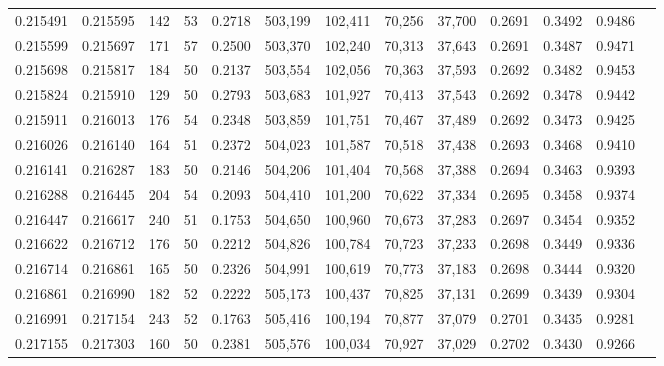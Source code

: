 \begin{tabular}{rrrrrrrrrrrrr}
0.215491 & 0.215595 &   142 &  53 &                                     0.2718 & 503,199 & 102,411 &  70,256 &  37,700 & 0.2691 & 0.3492 & 0.9486 \\
0.215599 & 0.215697 &   171 &  57 &                                     0.2500 & 503,370 & 102,240 &  70,313 &  37,643 & 0.2691 & 0.3487 & 0.9471 \\
0.215698 & 0.215817 &   184 &  50 &                                     0.2137 & 503,554 & 102,056 &  70,363 &  37,593 & 0.2692 & 0.3482 & 0.9453 \\
0.215824 & 0.215910 &   129 &  50 &                                     0.2793 & 503,683 & 101,927 &  70,413 &  37,543 & 0.2692 & 0.3478 & 0.9442 \\
0.215911 & 0.216013 &   176 &  54 &                                     0.2348 & 503,859 & 101,751 &  70,467 &  37,489 & 0.2692 & 0.3473 & 0.9425 \\
0.216026 & 0.216140 &   164 &  51 &                                     0.2372 & 504,023 & 101,587 &  70,518 &  37,438 & 0.2693 & 0.3468 & 0.9410 \\
0.216141 & 0.216287 &   183 &  50 &                                     0.2146 & 504,206 & 101,404 &  70,568 &  37,388 & 0.2694 & 0.3463 & 0.9393 \\
0.216288 & 0.216445 &   204 &  54 &                                     0.2093 & 504,410 & 101,200 &  70,622 &  37,334 & 0.2695 & 0.3458 & 0.9374 \\
0.216447 & 0.216617 &   240 &  51 &                                     0.1753 & 504,650 & 100,960 &  70,673 &  37,283 & 0.2697 & 0.3454 & 0.9352 \\
0.216622 & 0.216712 &   176 &  50 &                                     0.2212 & 504,826 & 100,784 &  70,723 &  37,233 & 0.2698 & 0.3449 & 0.9336 \\
0.216714 & 0.216861 &   165 &  50 &                                     0.2326 & 504,991 & 100,619 &  70,773 &  37,183 & 0.2698 & 0.3444 & 0.9320 \\
0.216861 & 0.216990 &   182 &  52 &                                     0.2222 & 505,173 & 100,437 &  70,825 &  37,131 & 0.2699 & 0.3439 & 0.9304 \\
0.216991 & 0.217154 &   243 &  52 &                                     0.1763 & 505,416 & 100,194 &  70,877 &  37,079 & 0.2701 & 0.3435 & 0.9281 \\
0.217155 & 0.217303 &   160 &  50 &                                     0.2381 & 505,576 & 100,034 &  70,927 &  37,029 & 0.2702 & 0.3430 & 0.9266 \\

\end{tabular}
